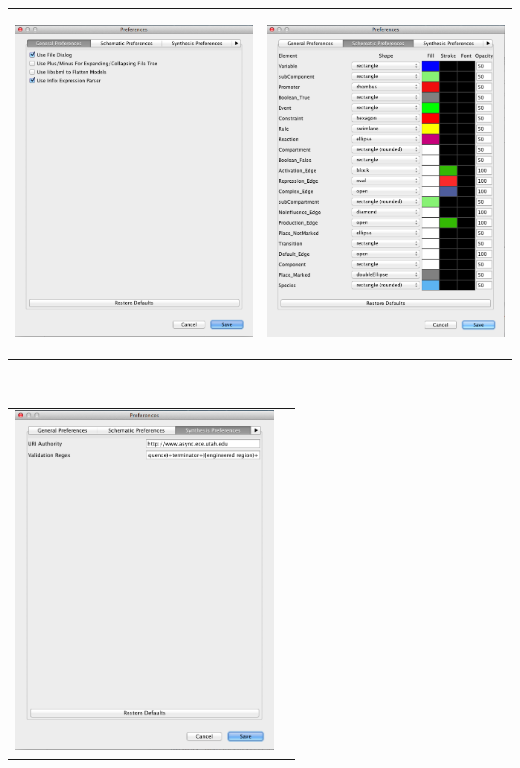 \documentclass[titlepage,11pt]{article}
\begin{document}
\begin{center}
\begin{tabular}{cc}
\includegraphics[height=90mm]{screenshots/GenPref} &
\includegraphics[height=90mm]{screenshots/SchPref} 
\end{tabular} \\
\begin{tabular}{cc}
\includegraphics[height=90mm]{screenshots/SynPref} &

\end{tabular}
\end{center}
\end{document}
